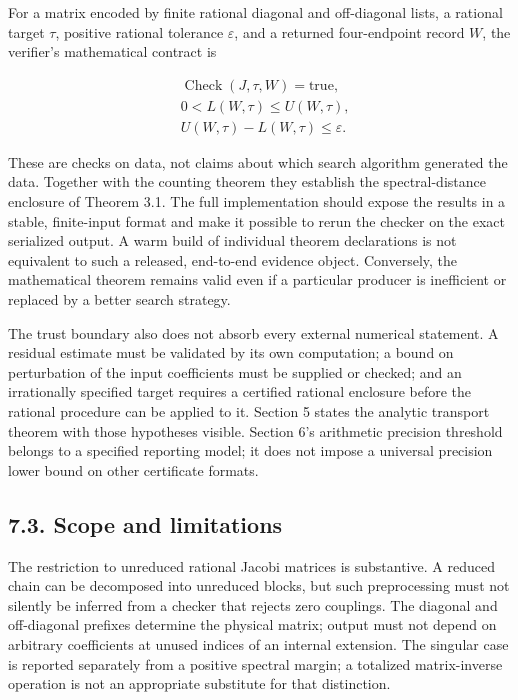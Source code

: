 \documentclass[
  11pt,
]{article}
\begin{document}
For a matrix encoded by finite rational diagonal and off-diagonal lists,
a rational target \(\tau\), positive rational tolerance \(\varepsilon\),
and a returned four-endpoint record \(W\), the verifier's mathematical
contract is

\[
\begin{split}
&\operatorname{Check}(J,\tau,W)=\mathrm{true},\\
&0<L(W,\tau)\le U(W,\tau),\\
&U(W,\tau)-L(W,\tau)\le\varepsilon.
\end{split}
\tag{7.2}
\]

These are checks on data, not claims about which search algorithm
generated the data. Together with the counting theorem they establish
the spectral-distance enclosure of Theorem 3.1. The full implementation
should expose the results in a stable, finite-input format and make it
possible to rerun the checker on the exact serialized output. A warm
build of individual theorem declarations is not equivalent to such a
released, end-to-end evidence object. Conversely, the mathematical
theorem remains valid even if a particular producer is inefficient or
replaced by a better search strategy.

The trust boundary also does not absorb every external numerical
statement. A residual estimate must be validated by its own computation;
a bound on perturbation of the input coefficients must be supplied or
checked; and an irrationally specified target requires a certified
rational enclosure before the rational procedure can be applied to it.
Section 5 states the analytic transport theorem with those hypotheses
visible. Section 6's arithmetic precision threshold belongs to a
specified reporting model; it does not impose a universal precision
lower bound on other certificate formats.

\subsection{7.3. Scope and limitations}\label{scope-and-limitations}

The restriction to unreduced rational Jacobi matrices is substantive. A
reduced chain can be decomposed into unreduced blocks, but such
preprocessing must not silently be inferred from a checker that rejects
zero couplings. The diagonal and off-diagonal prefixes determine the
physical matrix; output must not depend on arbitrary coefficients at
unused indices of an internal extension. The singular case is reported
separately from a positive spectral margin; a totalized matrix-inverse
operation is not an appropriate substitute for that distinction.
\end{document}
